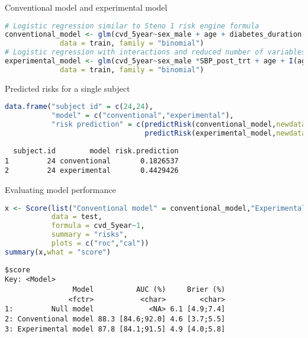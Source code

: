 \documentclass{beamer}\usepackage{listings}
\begin{document}
\begin{frame}[label={sec:orgf094b28},fragile]{Conventional model and experimental model}
 \begin{lstlisting}[language=r,numbers=none,otherkeywords={}, deletekeywords={model}]
# Logistic regression similar to Steno 1 risk engine formula
conventional_model <- glm(cvd_5year~sex_male + age + diabetes_duration + smoking + motion + HBA1C_post_trt + urine_albumin_post_trt + LDL_post_trt + SBP_post_trt + eGFR_post_trt,
             data = train, family = "binomial")
# Logistic regression with interactions and reduced number of variables
experimental_model <- glm(cvd_5year~sex_male *SBP_post_trt + age + I(age>40) * eGFR_post_trt + diabetes_duration + smoking + motion,
             data = train, family = "binomial")
\end{lstlisting}
\end{frame}
\begin{frame}[label={sec:orgb4471d5},fragile]{Predicted risks for a single subject}
 \begin{lstlisting}[language=r,numbers=none,otherkeywords={}, deletekeywords={model,c}]
data.frame("subject id" = c(24,24),
           "model" = c("conventional","experimental"),
           "risk prediction" = c(predictRisk(conventional_model,newdata = test[24,]),
                                 predictRisk(experimental_model,newdata = test[24,])))
\end{lstlisting}

\label{}
\begin{verbatim}
  subject.id        model risk.prediction
1         24 conventional       0.1826537
2         24 experimental       0.4429426
\end{verbatim}
\end{frame}
\begin{frame}[label={sec:org17552be},fragile]{Evaluating model performance}
 \begin{lstlisting}[language=r,numbers=none,otherkeywords={}, deletekeywords={model,c}]
x <- Score(list("Conventional model" = conventional_model,"Experimental model" = experimental_model),
           data = test,
           formula = cvd_5year~1,
           summary = "risks",
           plots = c("roc","cal"))
summary(x,what = "score")
\end{lstlisting}

\label{}
\begin{verbatim}
$score
Key: <Model>
                Model          AUC (%)     Brier (%)
               <fctr>           <char>        <char>
1:         Null model             <NA> 6.1 [4.9;7.4]
2: Conventional model 88.3 [84.6;92.0] 4.6 [3.7;5.5]
3: Experimental model 87.8 [84.1;91.5] 4.9 [4.0;5.8]
\end{verbatim}
\end{frame}
\end{document}
